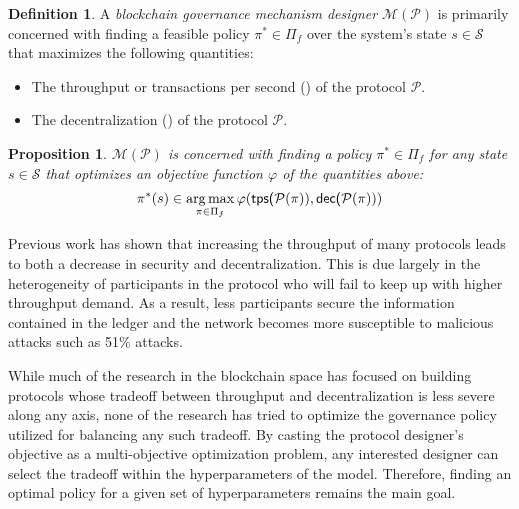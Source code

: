 \documentclass{article}
\DeclareMathOperator*{\argmax}{arg\,max}
\newtheorem{proposition}{Proposition}[section]
\theoremstyle{definition}
\newtheorem{definition}{Definition}[section]
\theoremstyle{definition}
\newcounter{protocol}
\begin{document}
\begin{definition}
A \textit{blockchain governance mechanism designer} $\mathcal{M}(\mathcal{P})$ is primarily concerned with finding a feasible policy $\pi^*\in \Pi_f$ over the system's state $s\in \mathcal{S}$ that maximizes the following quantities:
\begin{itemize}
    \item The throughput or transactions per second () of the protocol $\mathcal{P}$.

    \item The decentralization () of the protocol $\mathcal{P}$.
\end{itemize}
\end{definition}
\begin{proposition}
$\mathcal{M}(\mathcal{P})$ is concerned with finding a policy $\pi^*\in \Pi_f$ for any state $s\in\mathcal{S}$ that optimizes an objective function $\varphi$ of the quantities above:
\begin{align*}
    \pi^*(s) \in \argmax_{\pi \in \Pi_f}
    \varphi(\text{\fontfamily{lmss}\selectfont tps($\mathcal{P}(\pi))$}, \text{\fontfamily{lmss}\selectfont dec($\mathcal{P}(\pi))$})
\end{align*}
\end{proposition}
Previous work \cite{previous work} has shown that increasing the throughput of many protocols leads to both a decrease in security and decentralization. This is due largely in the heterogeneity of participants in the protocol who will fail to keep up with higher throughput demand. As a result, less participants secure the information contained in the ledger and the network becomes more susceptible to malicious attacks such as 51\% attacks.

While much of the research in the blockchain space has focused on building protocols whose tradeoff between throughput and decentralization is less severe along any axis, none of the research has tried to optimize the governance policy utilized for balancing any such tradeoff. By casting the protocol designer's objective as a multi-objective optimization problem, any interested designer can select the tradeoff within the hyperparameters of the model. Therefore, finding an optimal policy for a given set of hyperparameters remains the main goal.
\end{document}

